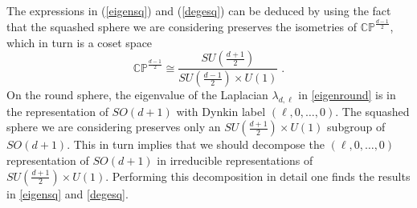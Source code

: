 \documentclass[12pt]{article}
\numberwithin{equation}{section}
\newcommand{\req}[1]{(\ref{#1})} %
\begin{document}
The expressions in \req{eigensq} and \req{degesq} can be deduced by using the fact that the squashed sphere we are considering preserves the isometries of $\mathbb{CP}^{\frac{d-1}{2}}$, which in turn is a coset space
%
\begin{equation}
\mathbb{CP}^{\frac{d-1}{2}} \cong \dfrac{SU(\frac{d+1}{2})}{SU(\frac{d-1}{2})\times U(1)}\;.
\end{equation}
%
On the round sphere, the eigenvalue of the Laplacian $\lambda_{d,\ell}$ in \eqref{eigenround} is in the representation of $SO(d+1)$ with Dynkin label $(\ell,0,\ldots,0)$. The squashed sphere we are considering preserves only an $SU(\frac{d+1}{2})\times U(1)$ subgroup of $SO(d+1)$. This in turn implies that we should decompose the $(\ell,0,\ldots,0)$ representation of $SO(d+1)$ in irreducible representations of $SU(\frac{d+1}{2})\times U(1)$. Performing this decomposition in detail one finds the results in \eqref{eigensq} and \eqref{degesq}.
\end{document}
